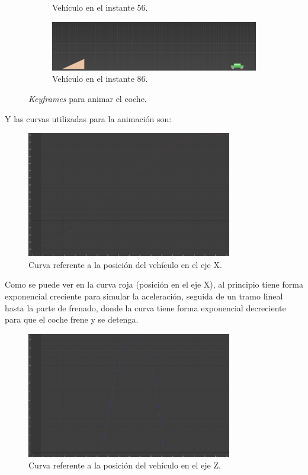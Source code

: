 \documentclass{article}
\begin{document}
\begin{figure}[H]
\begin{subfigure}[H]{0.48\textwidth}
        \caption{Vehículo en el instante 56.}
    \end{subfigure}
    \hfill
    \begin{subfigure}[H]{0.48\textwidth}
        \centering
        \includegraphics[width=\textwidth]{imagenes/Ejercicio2/keyframes/86.png}
        \caption{Vehículo en el instante 86.}
    \end{subfigure}
    \caption{\textit{Keyframes} para animar el coche.}
\end{figure}


Y las curvas utilizadas para la animación son:
\begin{figure}[H]
    \centering
    \includegraphics[width=0.8\textwidth]{imagenes/Ejercicio2/curvas/red.png}
    \caption{Curva referente a la posición del vehículo en el eje X.}
\end{figure}

\bigskip

Como se puede ver en la curva roja (posición en el eje X), al principio tiene forma exponencial creciente para simular la aceleración, seguida de un tramo lineal hasta la parte de frenado, donde la curva tiene forma exponencial decreciente para que el coche frene y se detenga.

\begin{figure}[H]
    \centering
    \includegraphics[width=0.8\textwidth]{imagenes/Ejercicio2/curvas/blue.png}
    \caption{Curva referente a la posición del vehículo en el eje Z.}
\end{figure}
\end{document}
